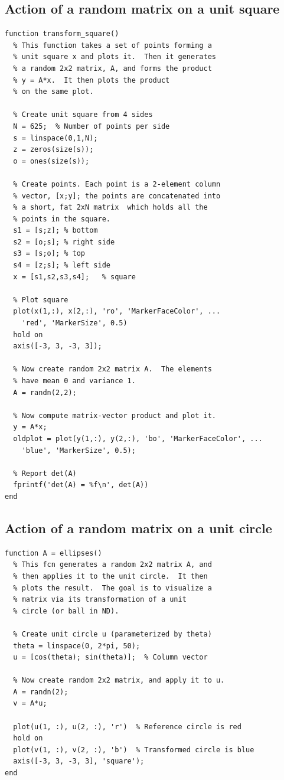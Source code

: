 \documentclass[onefignum,onetabnum]{siamart190516}
\begin{document}
\subsection{Action of a random matrix on a unit square}
\label{mat:ActionUnitSquare}
\begin{verbatim}
function transform_square()
  % This function takes a set of points forming a
  % unit square x and plots it.  Then it generates 
  % a random 2x2 matrix, A, and forms the product
  % y = A*x.  It then plots the product 
  % on the same plot.

  % Create unit square from 4 sides
  N = 625;  % Number of points per side
  s = linspace(0,1,N);
  z = zeros(size(s));
  o = ones(size(s));
  
  % Create points. Each point is a 2-element column 
  % vector, [x;y]; the points are concatenated into 
  % a short, fat 2xN matrix  which holds all the 
  % points in the square.
  s1 = [s;z]; % bottom
  s2 = [o;s]; % right side
  s3 = [s;o]; % top
  s4 = [z;s]; % left side
  x = [s1,s2,s3,s4];   % square

  % Plot square
  plot(x(1,:), x(2,:), 'ro', 'MarkerFaceColor', ...
    'red', 'MarkerSize', 0.5)
  hold on
  axis([-3, 3, -3, 3]);

  % Now create random 2x2 matrix A.  The elements 
  % have mean 0 and variance 1.
  A = randn(2,2);

  % Now compute matrix-vector product and plot it.
  y = A*x;
  oldplot = plot(y(1,:), y(2,:), 'bo', 'MarkerFaceColor', ...
    'blue', 'MarkerSize', 0.5); 

  % Report det(A)
  fprintf('det(A) = %f\n', det(A))
end
\end{verbatim}

\subsection{Action of a random matrix on a unit circle}
\label{Mat:ActionUnitBall}
\begin{verbatim}
function A = ellipses()
  % This fcn generates a random 2x2 matrix A, and 
  % then applies it to the unit circle.  It then 
  % plots the result.  The goal is to visualize a 
  % matrix via its transformation of a unit
  % circle (or ball in ND).

  % Create unit circle u (parameterized by theta)
  theta = linspace(0, 2*pi, 50);
  u = [cos(theta); sin(theta)];  % Column vector

  % Now create random 2x2 matrix, and apply it to u.
  A = randn(2);
  v = A*u;

  plot(u(1, :), u(2, :), 'r')  % Reference circle is red
  hold on
  plot(v(1, :), v(2, :), 'b')  % Transformed circle is blue
  axis([-3, 3, -3, 3], 'square');
end
\end{verbatim}
\end{document}
